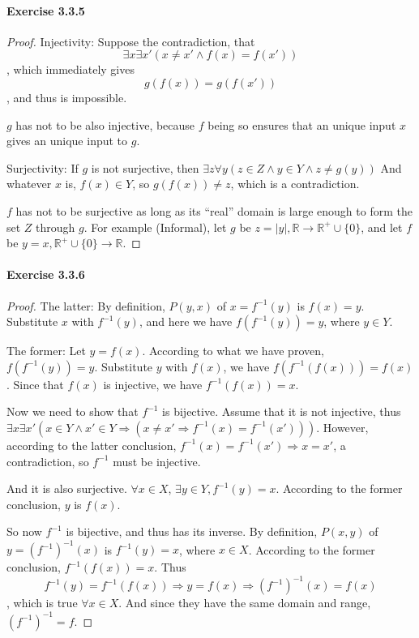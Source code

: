\paragraph{Exercise 3.3.5} \label{exercise3.3.5}
\begin{proof}
Injectivity:
Suppose the contradiction, that 
\[
\exists x \exists x'(x \neq x' \wedge f(x) = f(x'))
\], which immediately gives 
\[
g(f(x)) = g(f(x'))
\], and thus is impossible.

$g$ has not to be also injective, because $f$ being so ensures that an unique input $x$ gives an unique 
input to $g$.

Surjectivity:
If $g$ is not surjective, then $\exists z \forall y(z \in Z \wedge y \in Y \wedge z \neq g(y))$
And whatever $x$ is, $f(x) \in Y$, so $g(f(x)) \neq z$, which is a contradiction.

$f$ has not to be surjective as long as its ``real'' domain is large enough to form the set $Z$ through 
$g$. For example (Informal), let $g$ be $z = |y|, \mathbb{R} \rightarrow \mathbb{R}^{+}\cup\{0\}$, and 
let $f$ be $y = x, \mathbb{R}^{+}\cup\{0\} \rightarrow \mathbb{R}$.
\end{proof}

\paragraph{Exercise 3.3.6} \label{exercise3.3.6}
\begin{proof}
The latter:
By definition, $P(y,x)$ of $x = f^{-1}(y)$ is $f(x)=y$. Substitute $x$ with $f^{-1}(y)$, and here we 
have $f(f^{-1}(y)) = y$, where $y \in Y$.

The former: Let $y = f(x)$. According to what we have proven, \\
$f(f^{-1}(y)) = y$. Substitute $y$ with 
$f(x)$, we have $f(f^{-1}(f(x))) = f(x)$. Since that $f(x)$ is injective, we have $f^{-1}(f(x)) = x$.

Now we need to show that $f^{-1}$ is bijective. Assume that it is not injective, thus 
$\exists x \exists x'(x \in Y \wedge x' \in Y \Longrightarrow(x\neq x' \Longrightarrow f^{-1}(x) = 
f^{-1}(x')))$.
However, according to the latter conclusion, $f^{-1}(x) = f^{-1}(x') \Longrightarrow x=x'$, a 
contradiction, so $f^{-1}$ must be injective.

And it is also surjective. $\forall x \in X$, $\exists y \in Y, f^{-1}(y)=x$. According to the former 
conclusion, $y$ is $f(x)$.

So now $f^{-1}$ is bijective, and thus has its inverse. By definition, $P(x,y)$ of 
$y = (f^{-1})^{-1}(x)$ is $f^{-1}(y) = x$, where $x \in X$. According to the former conclusion, 
$f^{-1}(f(x)) = x$. Thus
\[
f^{-1}(y) = f^{-1}(f(x)) \Longrightarrow y = f(x) \Longrightarrow (f^{-1})^{-1}(x) = f(x)
\], which is true $\forall x \in X$. And since they have the same domain and range, $(f^{-1})^{-1} = f$.
\end{proof}

